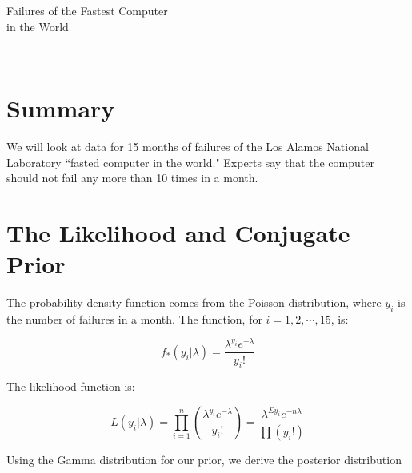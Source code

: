 \documentclass[12pt]{article}
\begin{document}
\newpage

\begin{center}
\begin{LARGE}
\sc Failures of the Fastest Computer \\ [.3cm]
\sc in the World
\end{LARGE}
\\ [.5 cm]
\end{center}

\section*{Summary}

\noindent We will look at data for 15 months of failures of the Los Alamos National Laboratory ``fasted computer in the world."  Experts say that the computer should not fail any more than 10 times in a month.

\section*{The Likelihood and Conjugate Prior}

The probability density function comes from the Poisson distribution, where $y_i$ is the number of failures in a month.  The function, for $i=1,2,\cdots,15$, is:

\[f_*(y_i|\lambda)=\frac{\lambda^{y_i}e^{-\lambda}}{y_i!} \]

\noindent The likelihood function is:

\[L(y_i|\lambda) = \prod_{i=1}^n\left(\frac{\lambda^{y_i}e^{-\lambda}}{y_i!}\right) = \frac{\lambda^{\Sigma y_i}e^{-n\lambda}}{\prod (y_i!)}\]



\noindent Using the Gamma distribution for our prior, we derive the posterior distribution \\ [-1.cm]
\end{document}
